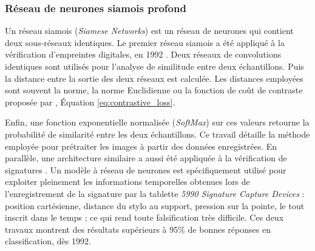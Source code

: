 


\subsubsection{Réseau de neurones siamois profond} \label{subsubsec:siamese}
Un réseau siamois (\textit{Siamese Networks}) est un réseau de neurones qui contient deux sous-réseaux identiques.
Le premier réseau siamois a été appliqué à la vérification d'empreintes digitales, en 1992 \cite{baldi_neural_1993}.
Deux réseaux de convolutions identiques sont utilisés pour l'analyse de similitude entre deux échantillons.
Puis la distance entre la sortie des deux réseaux est calculée.
Les distances employées sont souvent la norme, la norme Euclidienne ou la fonction de coût de contraste proposée par \citeauthor{hadsell_dimensionality_2006} \cite{hadsell_dimensionality_2006}, Équation \ref{eq:contrastive_loss}.

Enfin, une fonction exponentielle normalisée (\textit{SoftMax}) sur ces valeurs retourne la probabilité de similarité entre les deux échantillons.
Ce travail détaille la méthode employée pour prétraiter les images à partir des données enregistrées.
En parallèle, une architecture similaire a aussi été appliquée à la vérification de signatures \cite{bromley_signature_1993}.
Un modèle à réseau de neurones est spécifiquement utilisé pour exploiter pleinement les informations temporelles obtenues lors de l'enregistrement de la signature par la tablette \textit{5990 Signature Capture Devices} : position cartésienne, distance du stylo au support, pression sur la pointe, le tout inscrit dans le temps ; ce qui rend toute falsification très difficile.
Ces deux travaux montrent des résultats supérieurs à 95\% de bonnes réponses en classification, dès 1992.

